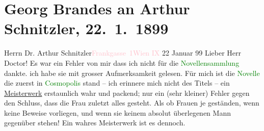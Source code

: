 

               \section[Georg Brandes an Arthur Schnitzler, 22. 1. 1899]{ Georg Brandes an Arthur Schnitzler, 22. 1. 1899}\nopagebreak{}\rehead{ }\normalsize\beginnumbering{} \toendnotes[C]{\smallbreak\pagebreak[2]} 
\toendnotes[C]{\smallbreak}\pstart{}{\pb}Herrn Dr. Arthur
                        Schnitzler\pend{}\pstart{}\textcolor{pink}{Frankgasse 1}{}\ledrightnote{\textcolor{pink}{Frankgasse}}\pend{}\pstart{}\textcolor{pink}{Wien IX}{}\ledrightnote{\textcolor{pink}{IX., Alsergrund}}\pend{}{\bigskip}\pstart
           \raggedleft{}{\pb}22 Januar 99\pend
           \pstart
           Lieber Herr Doctor! Es war ein Fehler von mir dass ich nicht
                    für die \textcolor{green}{Novellensammlung}{}
                    dankte. ich habe sie mit grosser Aufmerksamkeit gelesen. Für mich ist die \textcolor{green}{Novelle}{} die zuerst in \textcolor{green}{Cosmopolis}{}\ledrightnote{\textcolor{green}{Cosmopolis}} stand – ich erinnere mich nicht des
                    Titels – ein \uline{Meisterwerk} erstaunlich wahr und
                    packend; nur ein (sehr kleiner) Fehler gegen den Schluss, dass die Frau zuletzt
                    alles gesteht. Als ob Frauen je geständen, wenn keine Beweise vorliegen, und
                    wenn sie keinem absolut überlegenen Mann gegenüber stehen! Ein wahres
                    Meisterwerk ist es dennoch.\pend
